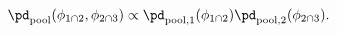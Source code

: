 \begin{equation}
  \pd_{\text{pool}} (\phi_{1 \cap 2}, \phi_{2 \cap 3}) \propto \pd_{\text{pool}, 1}(\phi_{1 \cap 2}) \pd_{\text{pool}, 2}(\phi_{2 \cap 3}).
  \label{eqn:silly-linear-overall}
\end{equation}